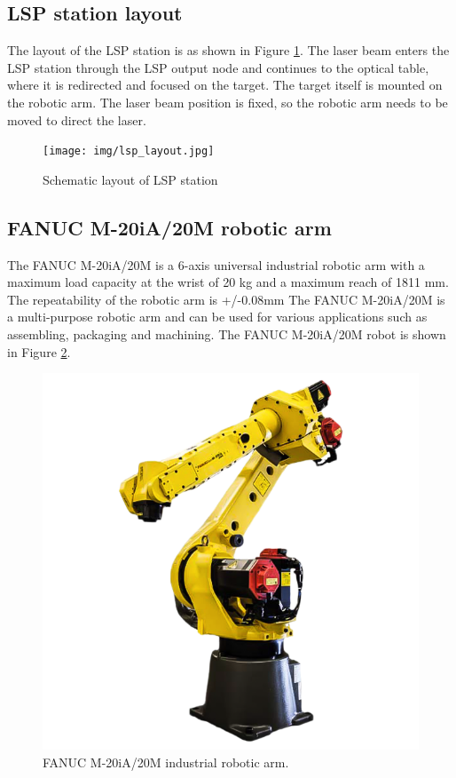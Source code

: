 \subsection{LSP station layout}

The layout of the LSP station is as shown in Figure \ref{fig:lsplayout}. The laser
beam enters the LSP station through the LSP output node and
continues to the optical table, where it is redirected and
focused on the target. The target itself is mounted on the
robotic arm. The laser beam position is fixed, so the robotic
arm needs to be moved to direct the laser.

\begin{figure}[h]
    \centering
    \texttt{[image: img/lsp\_layout.jpg]}
    \caption{Schematic layout of LSP station}
    \label{fig:lsplayout}
\end{figure}

\subsection{FANUC M-20iA/20M robotic arm}

The FANUC M-20iA/20M is a 6-axis universal industrial robotic arm with a maximum load capacity at the wrist of 20 kg and a maximum reach of 1811 mm. The repeatability of the robotic arm is +/-0.08mm The FANUC M-20iA/20M is a multi-purpose robotic arm and can be used for various applications such as assembling, packaging and machining. The  FANUC M-20iA/20M robot is shown in Figure \ref{fig:fanucrobot}.

\begin{figure}[h]
    \centering
    \includegraphics[width=0.6\linewidth]{img/fanuc_robot.png}
    \caption{FANUC M-20iA/20M industrial robotic arm.}
    \label{fig:fanucrobot}
\end{figure}

